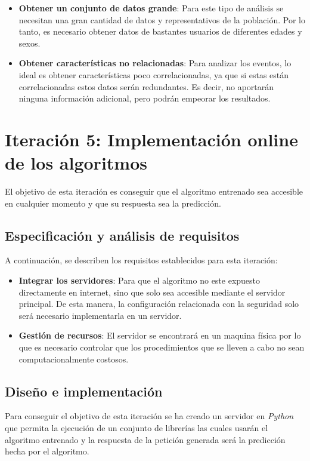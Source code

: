 \begin{itemize}
    \item \textbf{Obtener un conjunto de datos grande}: Para este tipo de análisis se necesitan  una gran cantidad de datos y representativos de la población. Por lo tanto, es necesario obtener datos de bastantes usuarios de diferentes edades y sexos.
    
    \item \textbf{Obtener características no relacionadas}: Para analizar los eventos, lo ideal es obtener características poco correlacionadas, ya que si estas están correlacionadas estos datos serán redundantes. Es decir, no aportarán ninguna información adicional, pero podrán empeorar los resultados.
\end{itemize}

 \section{Iteración 5: Implementación online de los algoritmos}
 El objetivo de esta iteración es conseguir que el algoritmo entrenado sea accesible en cualquier momento y que su respuesta sea la predicción.
 
 
 \subsection{Especificación y análisis de requisitos}
A continuación, se describen los requisitos establecidos para esta iteración:

\begin{itemize}
    \item \textbf{Integrar los servidores}: Para que el algoritmo no este expuesto directamente en internet, sino que solo sea accesible mediante el servidor principal. De esta manera, la configuración relacionada con la seguridad solo será necesario implementarla en un servidor.
    
    \item \textbf{Gestión de recursos}:  El servidor se encontrará en un maquina física por lo que es necesario controlar que los procedimientos que se lleven a cabo no sean computacionalmente costosos.   
\end{itemize}
 
 \subsection{Diseño e implementación}
 Para conseguir el objetivo de esta iteración se ha creado un servidor en \textit{Python} que permita la ejecución de un conjunto de librerías las cuales usarán el algoritmo entrenado y la respuesta de la petición generada será la predicción hecha por el algoritmo. 

